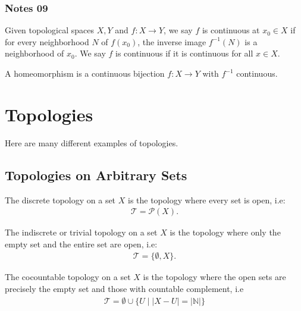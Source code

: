 \documentclass[12pt,letterpaper,reqno]{article}
\begin{document}
\subsubsection{Notes 09}

\begin{definition}\label{def:continuity-general}
    Given topological spaces $X, Y$ and $f: X \to Y$, we say $f$ is continuous at $x_0 \in X$ if for every neighborhood $N$ of $f(x_0)$, the inverse image $f^{-1}(N)$ is a neighborhood of $x_0$. We say $f$ is continuous if it is continuous for all $x \in X$.
\end{definition}

\begin{definition}[Homeomorphism]\label{def;homeomorphism}
    A homeomorphism is a continuous bijection $f: X \to Y$ with $f^{-1}$ continuous.
\end{definition}


\newpage
\section{Topologies}


Here are many different examples of topologies.

\subsection{Topologies on Arbitrary Sets}

\begin{topology}\label{topology:discrete-topology}
    The discrete topology on a set $X$ is the topology where every set is open, i.e:
    \begin{align*}
        \mathcal{T} = \mathcal{P}(X).
    \end{align*}
\end{topology}

\begin{topology}\label{topology:indiscrete-topology}
    The indiscrete or trivial topology on a set $X$ is the topology where only the empty set and the entire set are open, i.e:
    \begin{align*}
        \mathcal{T} = \{ \emptyset, X \}.
    \end{align*}
\end{topology}

\begin{topology}\label{topology:cocountable-topology}
    The cocountable topology on a set $X$ is the topology where the open sets are precisely the empty set and those with countable complement, i.e
    \begin{align*}
        \mathcal{T} = \emptyset \cup \{ U \mid |X - U| = | \mathbb{N}| \}
    \end{align*}
\end{topology}
\end{document}
